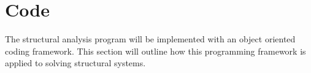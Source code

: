 \section{Code}

The structural analysis program will be implemented with an object oriented coding framework. This section will outline how this programming framework is applied to solving structural systems.





